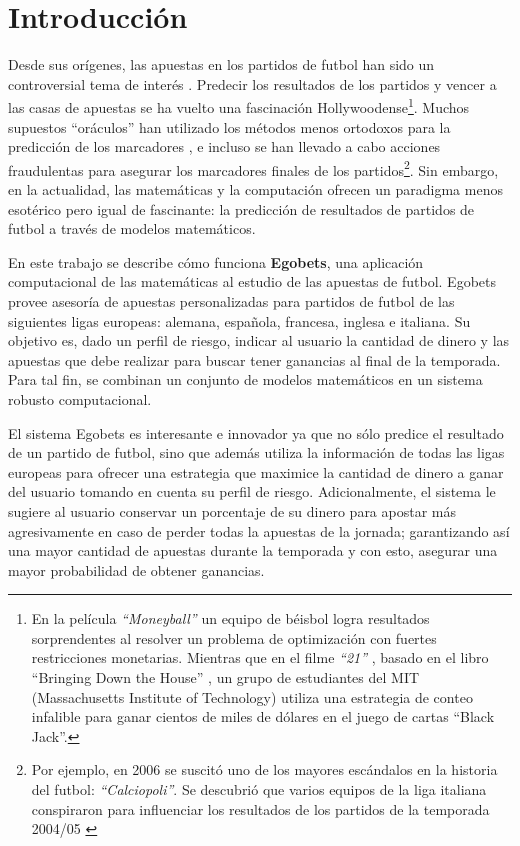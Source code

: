 \chapter{Introducción}

Desde sus orígenes, las apuestas en los partidos de futbol han sido un controversial tema de interés \cite{udovicic1998special}. Predecir los resultados de los partidos y vencer a las casas de apuestas se ha vuelto una fascinación Hollywoodense\footnote{En la película \emph{``Moneyball''} \cite{moneyball} un equipo de béisbol logra resultados sorprendentes al resolver un problema de optimización con fuertes restricciones monetarias. Mientras que en el filme \emph{``21''} \cite{21Movie}, basado en el libro ``Bringing Down the House'' \cite{patrick2008bringing}, un grupo de estudiantes del MIT (Massachusetts Institute of Technology) utiliza una estrategia de conteo infalible para ganar cientos de miles de dólares en el juego de cartas ``Black Jack''.}. Muchos supuestos ``oráculos'' han utilizado los métodos menos ortodoxos para la predicción de los marcadores \cite{prevos2010psychic}, e incluso se han llevado a cabo acciones fraudulentas para asegurar los marcadores finales de los partidos\footnote{Por ejemplo, en 2006 se suscitó uno de los mayores escándalos en la historia del futbol: \emph{``Calciopoli''}. Se descubrió que varios equipos de la liga italiana conspiraron para influenciar los resultados de los partidos de la temporada 2004/05 \cite{distaso2008corruption}}. Sin embargo, en la actualidad, las matemáticas y la computación ofrecen un paradigma menos esotérico pero igual de fascinante: la predicción de resultados de partidos de futbol a través de modelos matemáticos.

En este trabajo se describe cómo funciona \textbf{Egobets}, una aplicación computacional de las matemáticas al estudio de las apuestas de futbol. Egobets provee asesoría de apuestas personalizadas para partidos de futbol de las siguientes ligas europeas: alemana, española, francesa, inglesa e italiana. Su objetivo es, dado un perfil de riesgo, indicar al usuario la cantidad de dinero y las apuestas que debe realizar para buscar tener ganancias al final de la temporada. Para tal fin, se combinan un conjunto de modelos matemáticos en un sistema robusto computacional.

El sistema Egobets es interesante e innovador ya que no sólo predice el resultado de un partido de futbol, sino que además utiliza la información de todas las ligas europeas para ofrecer una estrategia que maximice la cantidad de dinero a ganar del usuario tomando en cuenta su perfil de riesgo. Adicionalmente, el sistema le sugiere al usuario conservar un porcentaje de su dinero para apostar más agresivamente en caso de perder todas la apuestas de la jornada; garantizando así una mayor cantidad de apuestas durante la temporada y con esto, asegurar una mayor probabilidad de obtener ganancias.

